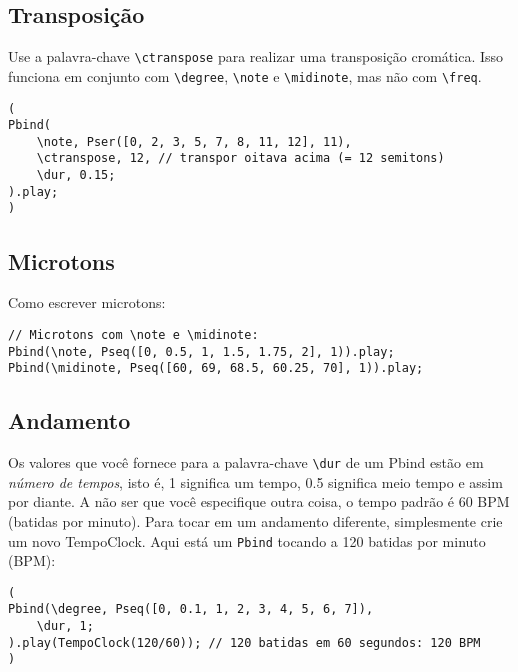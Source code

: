 \subsection{Transposição}

Use a palavra-chave \texttt{\textbackslash ctranspose} para realizar uma transposição cromática. Isso funciona em conjunto com \texttt{\textbackslash degree}, \texttt{\textbackslash note} e \texttt{\textbackslash midinote}, mas não com \texttt{\textbackslash freq}.

\begin{lstlisting}[style=SuperCollider-IDE, basicstyle=\scttfamily\footnotesize]
(
Pbind(
	\note, Pser([0, 2, 3, 5, 7, 8, 11, 12], 11),
	\ctranspose, 12, // transpor oitava acima (= 12 semitons)
	\dur, 0.15;
).play;
)
\end{lstlisting}

\subsection{Microtons}
 
Como escrever microtons:

\begin{lstlisting}[style=SuperCollider-IDE, basicstyle=\scttfamily\footnotesize]
// Microtons com \note e \midinote:
Pbind(\note, Pseq([0, 0.5, 1, 1.5, 1.75, 2], 1)).play;
Pbind(\midinote, Pseq([60, 69, 68.5, 60.25, 70], 1)).play;
\end{lstlisting}
 
\subsection{Andamento}

Os valores que você fornece para a palavra-chave \texttt{\textbackslash dur} de um Pbind estão em \emph{número de tempos}, isto é, 1 significa um tempo, 0.5 significa meio tempo e assim por diante. A não ser que você especifique outra coisa, o tempo padrão é 60 BPM (batidas por minuto). Para tocar em um andamento diferente, simplesmente crie um novo TempoClock. Aqui está um \texttt{Pbind} tocando a 120 batidas por minuto (BPM):
 
\begin{lstlisting}[style=SuperCollider-IDE, basicstyle=\scttfamily\footnotesize]
(
Pbind(\degree, Pseq([0, 0.1, 1, 2, 3, 4, 5, 6, 7]),
	\dur, 1;
).play(TempoClock(120/60)); // 120 batidas em 60 segundos: 120 BPM
)
\end{lstlisting}
 
